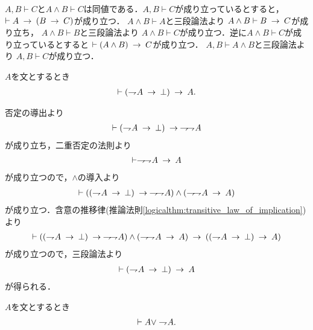 	$A,B \vdash C$と$A \wedge B \vdash C$は同値である．$A,B \vdash C$が成り立っているとすると，
	$\vdash A \rarrow (B \rarrow C)$が成り立つ．
	$A \wedge B \vdash A$と三段論法より
	$A \wedge B \vdash B \rarrow C$が成り立ち，
	$A \wedge B \vdash B$と三段論法より
	$A \wedge B \vdash C$が成り立つ．逆に$A \wedge B \vdash C$が成り立っているとすると
	$\vdash (A \wedge B) \rarrow C$が成り立つ．
	$A,B \vdash A \wedge B$と三段論法より
	$A, B \vdash C$が成り立つ．
	
	\begin{screen}
		\begin{logicalthm}[背理法の原理]
			$A$を文とするとき
			\begin{align}
				\vdash (\negation A \rarrow \bot) \rarrow A.
			\end{align}
		\end{logicalthm}
	\end{screen}
	
	\begin{prf}
		否定の導出より
		\begin{align}
			\vdash (\negation A \rarrow \bot) \rarrow \negation \negation A
		\end{align}
		が成り立ち，二重否定の法則より
		\begin{align}
			\vdash \negation \negation A \rarrow A
		\end{align}
		が成り立つので，$\wedge$の導入より
		\begin{align}
			\vdash ((\negation A \rarrow \bot) \rarrow \negation \negation A)
			\wedge (\negation \negation A \rarrow A)
		\end{align}
		が成り立つ．含意の推移律(推論法則\ref{logicalthm:transitive_law_of_implication})より
		\begin{align}
			\vdash ((\negation A \rarrow \bot) \rarrow \negation \negation A)
			\wedge (\negation \negation A \rarrow A)
			\rarrow ((\negation A \rarrow \bot) \rarrow A)
		\end{align}
		が成り立つので，三段論法より
		\begin{align}
			\vdash (\negation A \rarrow \bot) \rarrow A
		\end{align}
		が得られる．
		\QED
	\end{prf}
	
	\begin{screen}
		\begin{logicalthm}[排中律]\label{logicalthm:law_of_excluded_middle}
			$A$を文とするとき
			\begin{align}
				\vdash A \vee \negation A.
			\end{align}
		\end{logicalthm}
	\end{screen}
	
